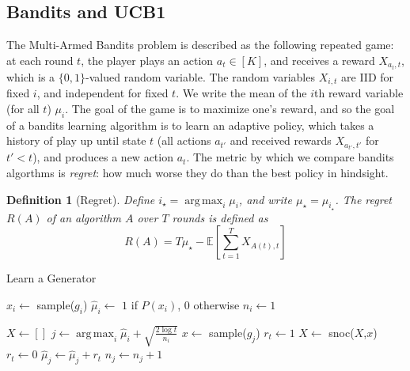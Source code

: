 \documentclass[sigconf,nonacm,review,anonymous]{acmart}
\newtheorem{definition}{Definition}
\DeclareMathOperator*{\argmax}{arg\,max}
\begin{document}
\subsection*{Bandits and UCB1}
The Multi-Armed Bandits problem is
described as the following repeated game: at each round $t$, the player plays an
action $a_t \in [K]$, and receives a reward $X_{{a_t},t}$, which is a
$\{0,1\}$-valued random variable. The random variables $X_{i,t}$ are IID for
fixed $i$, and independent for fixed $t$. We write the mean of the $i$th reward
variable (for all $t$) $\mu_i$. The goal of the game is to maximize one's
reward, and so the goal of a bandits learning algorithm is to learn an adaptive
policy, which takes a history of play up until state $t$ (all actions $a_{t'}$
and received rewards $X_{a_{t'},t'}$ for $t' < t$), and produces a new action
$a_t$. The metric by which we compare bandits algorthms is \textit{regret}: how
much worse they do than the best policy in hindsight.

\begin{definition}[Regret]
Define $i_\star = \argmax_i \mu_i$, and write $\mu_\star = \mu_{i_\star}$. The regret $R(A)$ of an algorithm $A$ over $T$ rounds is defined as
$$
R(A) = T\mu_\star - \mathbb{E}\left[\sum_{t=1}^T X_{A(t),t}\right]
$$
\end{definition}

\begin{algorithm}
    \caption{Learn a Generator}
    \label{alg:ucb1}
    \begin{algorithmic}
      \State $x_i \gets $ sample($g_i$)
      \State $\hat{\mu}_i \gets$ $1$ if $P(x_i)$, $0$ otherwise
      \State $n_i \gets 1$

      \EndFor
      \State $X \gets []$
        \State $j \gets \argmax_i \hat{\mu}_i + \sqrt{\frac{2\log t}{n_i}}$
        \State $x \gets$ sample($g_j$)
          \State $r_t \gets 1$
          \State $X \gets$ snoc($X$,$x$)
        \Else
          \State $r_t \gets 0$
        \EndIf
        \State $\hat{\mu}_j \gets \hat{\mu}_j + r_t$
        \State $n_j \gets n_j + 1$
      \EndFor
      \EndFunction
    \end{algorithmic}
\end{algorithm}
\end{document}
